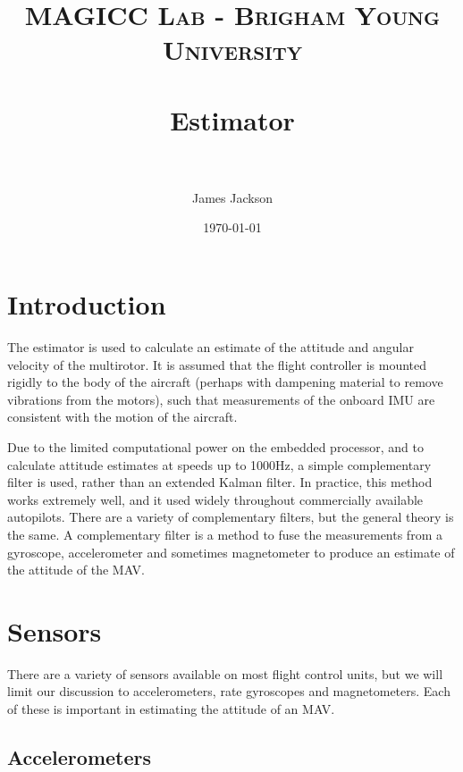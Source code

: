 \documentclass[paper=a4, fontsize=11pt]{scrartcl} %
\title{
\normalfont \normalsize
\textsc{MAGICC Lab - Brigham Young University} \\ [25pt] %
\horrule{0.5pt} \\[0.4cm] %
\huge Estimator \\ %
\horrule{2pt} \\[0.5cm] %
}
\author{James Jackson} %
\date{\normalsize\today} %
\numberwithin{equation}{section} %
\numberwithin{figure}{section} %
\numberwithin{table}{section} %
\begin{document}
\maketitle %


\section{Introduction}

The estimator is used to calculate an estimate of the attitude and angular velocity of the multirotor.  It is assumed that the flight controller is mounted rigidly to the body of the aircraft (perhaps with dampening material to remove vibrations from the motors), such that measurements of the onboard IMU are consistent with the motion of the aircraft.

Due to the limited computational power on the embedded processor, and to calculate attitude estimates at speeds up to 1000Hz, a simple complementary filter is used, rather than an extended Kalman filter.  In practice, this method works extremely well, and it used widely throughout commercially available autopilots.  There are a variety of complementary filters, but the general theory is the same.  A complementary filter is a method to fuse the measurements from a gyroscope, accelerometer and sometimes magnetometer to produce an estimate of the attitude of the MAV.

\section{Sensors}
There are a variety of sensors available on most flight control units, but we will limit our discussion to accelerometers, rate gyroscopes and magnetometers.  Each of these is important in estimating the attitude of an MAV.

\subsection{Accelerometers}
\end{document}
